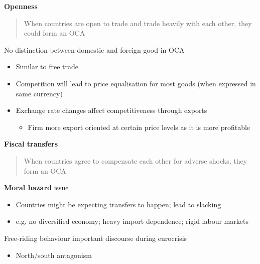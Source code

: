 \documentclass{beamer}
\begin{document}
\begin{frame}
  \textbf{Openness} 
  \begin{quote}
    When countries are open to trade and trade heavily with each other, they could form an OCA
  \end{quote}
  \medskip
   No distinction between domestic and foreign good in OCA
  \begin{itemize}
    \item Similar to free trade 
    \item Competition will lead to price equalisation for most goods (when expressed in same currency)
    \item Exchange rate changes affect competitiveness through exports
    \begin{itemize}
      \item Firm more export oriented at certain price levels as it is more profitable
    \end{itemize}    
  \end{itemize}
\end{frame}


\begin{frame}
  \textbf{Fiscal transfers} 
  \begin{quote}
    When countries agree to compensate each other for adverse shocks, they form an OCA
  \end{quote}
  \medskip
   \textbf{Moral hazard} issue  
  \begin{itemize}
    \item Countries might be expecting transfers to happen; lead to slacking
    \item e.g. no diversified economy; heavy import dependence; rigid labour markets
  \end{itemize}
  \medskip
  Free-riding behaviour important discourse during eurocrisis
  \begin{itemize}
    \item North/south antagonism
  \end{itemize}
\end{frame}
\end{document}
